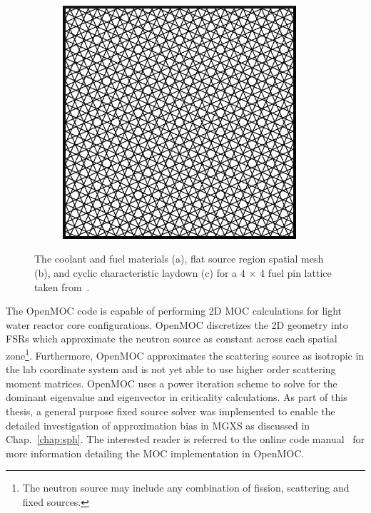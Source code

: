 \begin{figure}[h!]
\begin{subfigure}[htb!]{0.32\textwidth}
    \label{fig:moc-model-fsrs}
    \caption{}
  \end{subfigure}
  \begin{subfigure}[htb!]{0.32\textwidth}
    \centering
    \includegraphics[width=0.95\textwidth]{figures/workflow/openmoc/cyclic-tracks}
    \label{fig:moc-model-tracks}
    \caption{}
  \end{subfigure}
\caption{The coolant and fuel materials (a), flat source region spatial mesh (b), and cyclic characteristic laydown (c) for a 4 $\times$ 4 fuel pin lattice taken from~\cite{boyd2016parallel}.}
\label{fig:moc-model}
\end{figure}

The OpenMOC code is capable of performing 2D \ac{MOC} calculations for light water reactor core configurations. OpenMOC discretizes the 2D geometry into \ac{FSR}s which approximate the neutron source as constant across each spatial zone\footnote{The neutron source may include any combination of fission, scattering and fixed sources.}. Furthermore, OpenMOC approximates the scattering source as isotropic in the lab coordinate system and is not yet able to use higher order scattering moment matrices. OpenMOC uses a power iteration scheme to solve for the dominant eigenvalue and eigenvector in criticality calculations. As part of this thesis, a general purpose fixed source solver was implemented to enable the detailed investigation of approximation bias in \ac{MGXS} as discussed in Chap.~\ref{chap:sph}. The interested reader is referred to the online code manual~\cite{openmoc2016manual} for more information detailing the \ac{MOC} implementation in OpenMOC.


